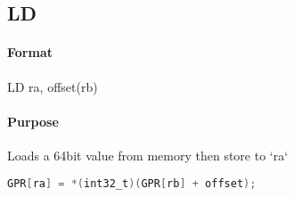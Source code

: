\subsection{LD}


\paragraph{Format} LD ra, offset(rb)

\paragraph{Purpose} Loads a 64bit value from memory then store to `ra`

\begin{lstlisting}[language=C]
    GPR[ra] = *(int32_t)(GPR[rb] + offset);
\end{lstlisting}